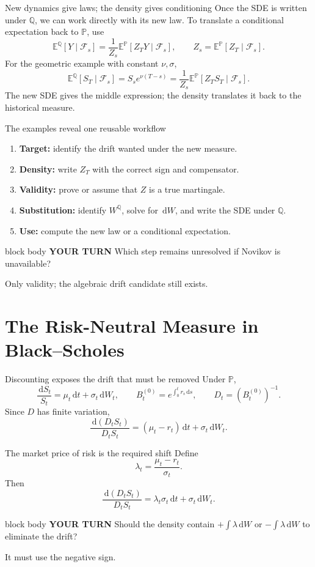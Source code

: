 \documentclass[handout,10pt,aspectratio=169]{beamer}
\newenvironment{pausebox}{\begin{beamercolorbox}[rounded=true,sep=0.8em,wd=\textwidth]{block body}
  \textbf{\color{CourseGold}YOUR TURN}\quad}{\end{beamercolorbox}}
\newcommand{\dd}{\,\mathrm d}
\newcommand{\E}{\mathbb E}
\newcommand{\Pp}{\mathbb P}
\newcommand{\Q}{\mathbb Q}
\newcommand{\cF}{\mathcal F}
\newcommand{\1}{\mathbf 1}
\begin{document}
\begin{frame}{New dynamics give laws; the density gives conditioning}
Once the SDE is written under \(\Q\), we can work directly with its new law.
To translate a conditional expectation back to \(\Pp\), use
\[
\boxed{
\E^\Q[Y\mid\cF_s]
=\frac1{Z_s}\E^\Pp[Z_TY\mid\cF_s],
\qquad Z_s=\E^\Pp[Z_T\mid\cF_s].}
\]
For the geometric example with constant \(\nu,\sigma\),
\[
\E^\Q[S_T\mid\cF_s]
=S_se^{\nu(T-s)}
=\frac1{Z_s}\E^\Pp[Z_TS_T\mid\cF_s].
\]
The new SDE gives the middle expression; the density translates it back to
the historical measure.
\end{frame}

\begin{frame}{The examples reveal one reusable workflow}
\begin{enumerate}
  \item \textbf{Target:} identify the drift wanted under the new measure.
  \item \textbf{Density:} write \(Z_T\) with the correct sign and compensator.
  \item \textbf{Validity:} prove or assume that \(Z\) is a true martingale.
  \item \textbf{Substitution:} identify \(W^\Q\), solve for \(\dd W\), and
  write the SDE under \(\Q\).
  \item \textbf{Use:} compute the new law or a conditional expectation.
\end{enumerate}
\begin{pausebox}
Which step remains unresolved if Novikov is unavailable?
\end{pausebox}

Only validity; the algebraic drift candidate still exists.
\end{frame}

\section{The Risk-Neutral Measure in Black--Scholes}

\begin{frame}{Discounting exposes the drift that must be removed}
Under \(\Pp\),
\[
\frac{\dd S_t}{S_t}=\mu_t\dd t+\sigma_t\dd W_t,
\qquad
B_t^{(0)}=e^{\int_0^tr_s\dd s},
\qquad D_t=(B_t^{(0)})^{-1}.
\]
Since \(D\) has finite variation,
\[
\boxed{
\frac{\dd(D_tS_t)}{D_tS_t}
=(\mu_t-r_t)\dd t+\sigma_t\dd W_t.}
\]
\end{frame}

\begin{frame}{The market price of risk is the required shift}
Define
\[
\lambda_t=\frac{\mu_t-r_t}{\sigma_t}.
\]
Then
\[
\frac{\dd(D_tS_t)}{D_tS_t}
=\lambda_t\sigma_t\dd t+\sigma_t\dd W_t.
\]
\begin{pausebox}
Should the density contain \(+\int\lambda\dd W\) or
\(-\int\lambda\dd W\) to eliminate the drift?
\end{pausebox}

It must use the negative sign.
\end{frame}
\end{document}
